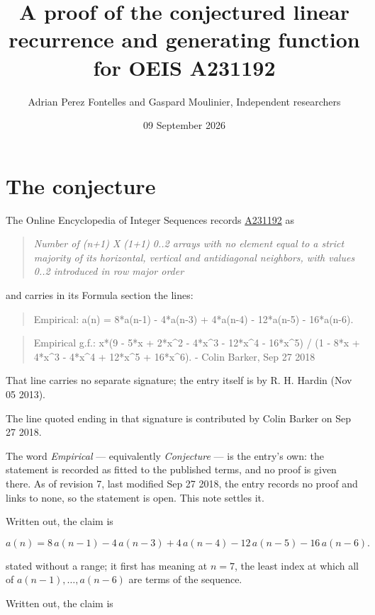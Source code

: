 \documentclass[11pt]{article}
\title{A proof of the conjectured linear recurrence and generating function for OEIS A231192}
\author{Adrian Perez Fontelles and Gaspard Moulinier, Independent researchers}
\date{09 September 2026}
\theoremstyle{definition}
\begin{document}
\maketitle
\section{The conjecture}

The Online Encyclopedia of Integer Sequences records \href{https://oeis.org/A231192}{A231192} as

\begin{quote}\itshape Number of (n+1) X (1+1) 0..2 arrays with no element equal to a strict majority of its horizontal, vertical and antidiagonal neighbors, with values 0..2 introduced in row major order\end{quote}

and carries in its Formula section the lines:

\begin{quote}\ttfamily Empirical: a(n) = 8*a(n-1) - 4*a(n-3) + 4*a(n-4) - 12*a(n-5) - 16*a(n-6).\end{quote}

\begin{quote}\ttfamily Empirical g.f.: x*(9 - 5*x + 2*x\textasciicircum{}2 - 4*x\textasciicircum{}3 - 12*x\textasciicircum{}4 - 16*x\textasciicircum{}5) / (1 - 8*x + 4*x\textasciicircum{}3 - 4*x\textasciicircum{}4 + 12*x\textasciicircum{}5 + 16*x\textasciicircum{}6). - Colin Barker, Sep 27 2018\end{quote}

That line carries no separate signature; the entry itself is by R. H. Hardin (Nov 05 2013).

The line quoted ending in that signature is contributed by Colin Barker on Sep 27 2018.

The word {\itshape Empirical} --- equivalently {\itshape Conjecture} --- is the entry's own: the statement is recorded as fitted to the published terms, and no proof is given there. As of revision 7, last modified Sep 27 2018, the entry records no proof and links to none, so the statement is open. This note settles it.

Written out, the claim is

\[a(n) = 8\,a(n-1) - 4\,a(n-3) + 4\,a(n-4) - 12\,a(n-5) - 16\,a(n-6).\]

stated without a range; it first has meaning at $n = 7$, the least index at which all of $a(n-1),\dots,a(n-6)$ are terms of the sequence.

Written out, the claim is
\end{document}
